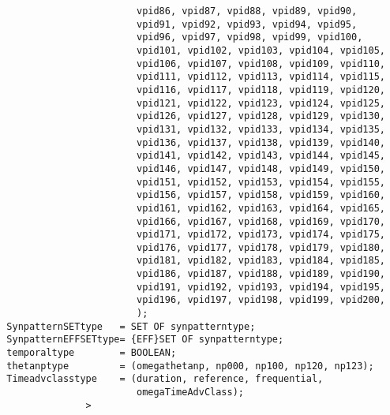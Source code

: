 \begin{verbatim}
                         vpid86, vpid87, vpid88, vpid89, vpid90,
                         vpid91, vpid92, vpid93, vpid94, vpid95,
                         vpid96, vpid97, vpid98, vpid99, vpid100,
                         vpid101, vpid102, vpid103, vpid104, vpid105,
                         vpid106, vpid107, vpid108, vpid109, vpid110,
                         vpid111, vpid112, vpid113, vpid114, vpid115,
                         vpid116, vpid117, vpid118, vpid119, vpid120,
                         vpid121, vpid122, vpid123, vpid124, vpid125,
                         vpid126, vpid127, vpid128, vpid129, vpid130,
                         vpid131, vpid132, vpid133, vpid134, vpid135,
                         vpid136, vpid137, vpid138, vpid139, vpid140,
                         vpid141, vpid142, vpid143, vpid144, vpid145,
                         vpid146, vpid147, vpid148, vpid149, vpid150,
                         vpid151, vpid152, vpid153, vpid154, vpid155,
                         vpid156, vpid157, vpid158, vpid159, vpid160,
                         vpid161, vpid162, vpid163, vpid164, vpid165,
                         vpid166, vpid167, vpid168, vpid169, vpid170,
                         vpid171, vpid172, vpid173, vpid174, vpid175,
                         vpid176, vpid177, vpid178, vpid179, vpid180,
                         vpid181, vpid182, vpid183, vpid184, vpid185,
                         vpid186, vpid187, vpid188, vpid189, vpid190,
                         vpid191, vpid192, vpid193, vpid194, vpid195,
                         vpid196, vpid197, vpid198, vpid199, vpid200,
                         );
  SynpatternSETtype   = SET OF synpatterntype;
  SynpatternEFFSETtype= {EFF}SET OF synpatterntype;
  temporaltype        = BOOLEAN;
  thetanptype         = (omegathetanp, np000, np100, np120, np123); 
  Timeadvclasstype    = (duration, reference, frequential,     
                         omegaTimeAdvClass);  
                >

\end{verbatim}

